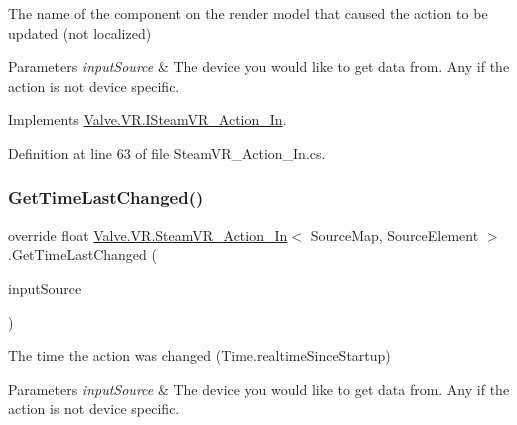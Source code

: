 The name of the component on the render model that caused the action to be updated (not localized) 


\begin{DoxyParams}{Parameters}
{\em input\+Source} & The device you would like to get data from. Any if the action is not device specific.\\
\hline
\end{DoxyParams}


Implements \mbox{\hyperlink{interface_valve_1_1_v_r_1_1_i_steam_v_r___action___in_a944e45d5e2e494a1bfd8d71989fe6926}{Valve.\+V\+R.\+I\+Steam\+V\+R\+\_\+\+Action\+\_\+\+In}}.



Definition at line 63 of file Steam\+V\+R\+\_\+\+Action\+\_\+\+In.\+cs.

\mbox{\label{class_valve_1_1_v_r_1_1_steam_v_r___action___in_accdc869f6fd50ef15580a271b6de4d30}} 
\subsubsection{\texorpdfstring{GetTimeLastChanged()}{GetTimeLastChanged()}}
{\footnotesize\ttfamily override float \mbox{\hyperlink{class_valve_1_1_v_r_1_1_steam_v_r___action___in}{Valve.\+V\+R.\+Steam\+V\+R\+\_\+\+Action\+\_\+\+In}}$<$ Source\+Map, Source\+Element $>$.Get\+Time\+Last\+Changed (\begin{DoxyParamCaption}\item[{\mbox{\hyperlink{namespace_valve_1_1_v_r_a82e5bf501cc3aa155444ee3f0662853f}{Steam\+V\+R\+\_\+\+Input\+\_\+\+Sources}}}]{input\+Source }\end{DoxyParamCaption})\hspace{0.3cm}{\ttfamily [virtual]}}



The time the action was changed (Time.\+realtime\+Since\+Startup) 


\begin{DoxyParams}{Parameters}
{\em input\+Source} & The device you would like to get data from. Any if the action is not device specific.\\
\hline
\end{DoxyParams}


